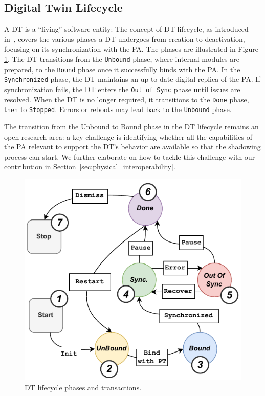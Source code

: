 \subsection{Digital Twin Lifecycle}

A \ac{DT} is a ``living'' software entity:
The concept of \ac{DT} lifecycle, as introduced in~\cite{web-of-dt-ricci-2022}, covers the various phases a \ac{DT} undergoes from creation to deactivation, focusing on its synchronization with the \ac{PA}.
The phases are illustrated in Figure \ref{fig:lifecycle}.
The \ac{DT} transitions from the \texttt{Unbound} phase, where internal modules are prepared, to the \texttt{Bound} phase once it successfully binds with the \ac{PA}.
In the \texttt{Synchronized} phase, the \ac{DT} maintains an up-to-date digital replica of the \ac{PA}.
If synchronization fails, the \ac{DT} enters the \texttt{Out of Sync} phase until issues are resolved.
When the \ac{DT} is no longer required, it transitions to the \texttt{Done} phase, then to \texttt{Stopped}.
Errors or reboots may lead back to the \texttt{Unbound} phase.

The transition from the Unbound to Bound phase in the \ac{DT} lifecycle remains an open research area:
a key challenge is identifying whether all the capabilities of the \ac{PA} relevant to support the \ac{DT}'s behavior are available so that the shadowing process can start.
We further elaborate on how to tackle this challenge with our contribution in Section~\ref{sec:physical_interoperability}.

\begin{figure}[t]
    \setlength{\belowcaptionskip}{-13pt}
    \centering
    \includegraphics[width=0.8\linewidth]{figures/dt-interoperability/dt-lifecycle.pdf}
    \caption{\acl{DT} lifecycle phases and transactions.}
    \label{fig:lifecycle}
\end{figure}

